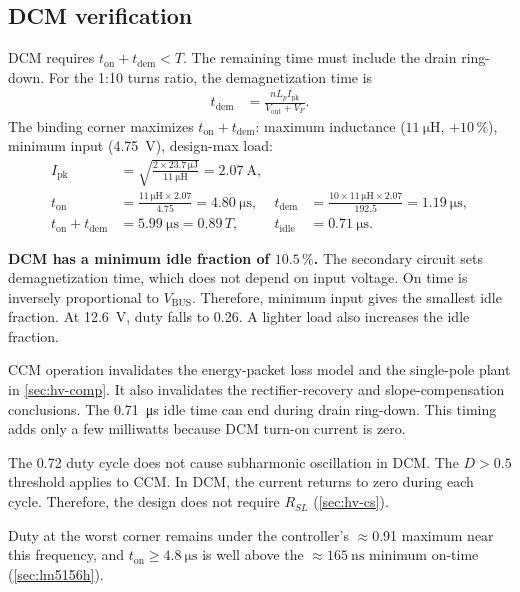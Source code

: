 \subsection{DCM verification}\label{sec:hv-dcm}

DCM requires $t_{\mathrm{on}} + t_{\mathrm{dem}} < T$. The remaining time must
include the drain ring-down. For the 1:10 turns ratio, the demagnetization time
is
\begin{align*}
  t_{\mathrm{dem}} &= \frac{n L_p I_{\mathrm{pk}}}{V_{\mathrm{out}} + V_F}.
\end{align*}
The binding corner maximizes $t_{\mathrm{on}} + t_{\mathrm{dem}}$: maximum
inductance ($\SI{11}{\micro\henry}$, $+10\,\%$), minimum input
(\SI{4.75}{\volt}), design-max load:
\begin{align*}
  I_{\mathrm{pk}} &= \sqrt{\frac{2\times23.7\,\si{\micro\joule}}{\SI{11}{\micro\henry}}}
  = \SI{2.07}{\ampere},\\
  t_{\mathrm{on}} &= \frac{11\,\si{\micro\henry}\times 2.07}{4.75}
  = \SI{4.80}{\micro\second}, &
  t_{\mathrm{dem}} &= \frac{10 \times 11\,\si{\micro\henry} \times 2.07}{192.5}
  = \SI{1.19}{\micro\second},\\
  t_{\mathrm{on}} + t_{\mathrm{dem}} &= \SI{5.99}{\micro\second}
  = 0.89\,T, &
  t_{\mathrm{idle}} &= \SI{0.71}{\micro\second}.
\end{align*}

\textbf{DCM has a minimum idle fraction of $10.5\,\%$.} The secondary circuit
sets demagnetization time, which does not depend on input voltage. On time is
inversely proportional to $V_{\mathrm{BUS}}$. Therefore, minimum input gives
the smallest idle fraction. At \SI{12.6}{\volt}, duty falls to 0.26. A lighter
load also increases the idle fraction.

CCM operation invalidates the energy-packet loss model and the single-pole
plant in \cref{sec:hv-comp}. It also invalidates the rectifier-recovery and
slope-compensation conclusions. The \SI{0.71}{\micro\second} idle time can end
during drain ring-down. This timing adds only a few milliwatts because DCM
turn-on current is zero.

The 0.72 duty cycle does not cause subharmonic oscillation in DCM. The
$D>0.5$ threshold applies to CCM. In DCM, the current returns to zero during
each cycle. Therefore, the design does not require $R_{SL}$
(\cref{sec:hv-cs}).

Duty at the worst corner remains under the controller's $\approx$0.91 maximum
near this frequency, and $t_{\mathrm{on}} \ge \SI{4.8}{\micro\second}$ is well
above the $\approx\SI{165}{\nano\second}$ minimum on-time (\cref{sec:lm5156h}).

